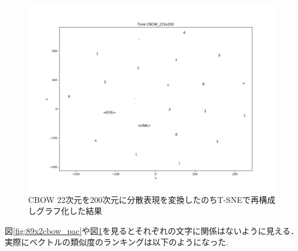\documentclass[a4j,11pt,report]{jsbook}
\begin{document}
\begin{center}
  \begin{figure}[H]
    \centering
    \includegraphics[width=\linewidth]{image/CBOW_tsne_out22_200.png}
    \caption{CBOW 22次元を200次元に分散表現を変換したのちT-SNEで再構成しグラフ化した結果}
    \label{fig:89x2cbow_tsne}
  \end{figure}
\end{center}

図\ref{fig:89x2cbow_pac}や図\ref{fig:89x2cbow_tsne}を見るとそれぞれの文字に関係はないように見える．
実際にベクトルの類似度のランキングは以下のようになった.
\end{document}
